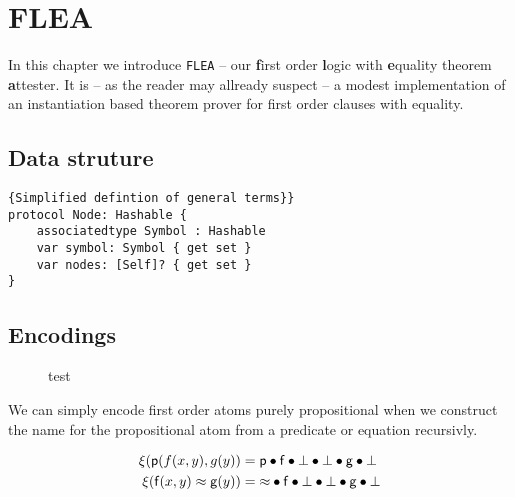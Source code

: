 
\chapter{FLEA}



In this chapter we introduce \verb|FLEA| --
our {\textbf f}irst order {\textbf l}ogic with {\textbf e}quality theorem {\textbf a}ttester. 
It is 
-- as the reader may allready suspect --
a modest implementation of an instantiation based theorem prover for first order clauses with equality.



\section{Data struture}

\begin{lstlisting}[language=flea]{Simplified defintion of general terms}}
protocol Node: Hashable {
	associatedtype Symbol : Hashable
	var symbol: Symbol { get set }
	var nodes: [Self]? { get set }
}
\end{lstlisting}

\section{Encodings}

\begin{figure}
	test
\end{figure}

We can simply encode first order atoms purely propositional 
when we construct the name for the propositional atom 
from a predicate or equation recursivly.

\begin{definition}
\end{definition}

\begin{example}
	\begin{align*}
	\xi({\mathsf p}(f(x,y),g(y)) &= {\mathsf p}\bullet{\mathsf f}\bullet\bot\bullet\bot\bullet{\mathsf g}\bullet\bot\\
	\xi({\mathsf f}(x,y)\approx {\mathsf g}(y)) &= {\approx}\bullet{\mathsf f}\bullet\bot\bullet\bot\bullet{\mathsf g}\bullet\bot\\
	\end{align*}
\end{example}

